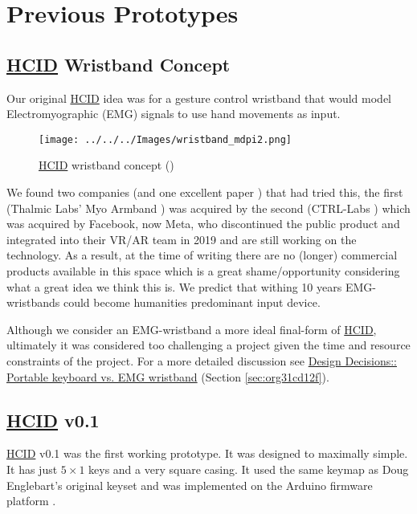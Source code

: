 \documentclass[logo,bsc,singlespacing,parskip]{infthesis}
\begin{document}
\chapter{Previous Prototypes}
\label{sec:org6518137}
\section{\hyperref[orgc00eca5]{HCID} Wristband Concept}
\label{sec:orgc77d313}
Our original \hyperref[orgc00eca5]{HCID} idea was for a gesture control wristband that would model Electromyographic (EMG) signals to use hand movements as input.

\begin{figure}[h]
\centering
\texttt{[image: ../../../Images/wristband\_mdpi2.png]}
\caption{\hyperref[orgc00eca5]{HCID} wristband concept (\autocite{cote-allardLowCostWireless3DPrinted2019})}
\end{figure}

We found two companies (and one excellent paper \autocite{cote-allardLowCostWireless3DPrinted2019}) that had tried this, the first (Thalmic Labs' Myo Armband \autocite{MyoGestureControl}) was acquired by the second (CTRL-Labs \autocite{27CTRLlabsLinkedIn}) which was acquired by Facebook, now Meta, who discontinued the public product and integrated into their VR/AR team in 2019 and are still working on the technology.
As a result, at the time of writing there are no (longer) commercial products available in this space which is a great shame/opportunity considering what a great idea we think this is.
We predict that withing 10 years EMG-wristbands could become humanities predominant input device.

Although we consider an EMG-wristband a more ideal final-form of \hyperref[orgc00eca5]{HCID}, ultimately it was considered too challenging a project given the time and resource constraints of the project. For a more detailed discussion see \hyperref[sec:org31cd12f]{Design Decisions:: Portable keyboard vs. EMG wristband} (Section \ref{sec:org31cd12f}).
\section{\hyperref[orgc00eca5]{HCID} v0.1}
\label{sec:org436a890}
\hyperref[orgc00eca5]{HCID} v0.1
was the first working prototype.
It was designed to maximally simple.
It has just \(5\times1\) keys and a very square casing.
It used the same keymap as Doug Englebart's original keyset and was implemented on the Arduino firmware platform \autocite{ArduinoHome}.
\end{document}
